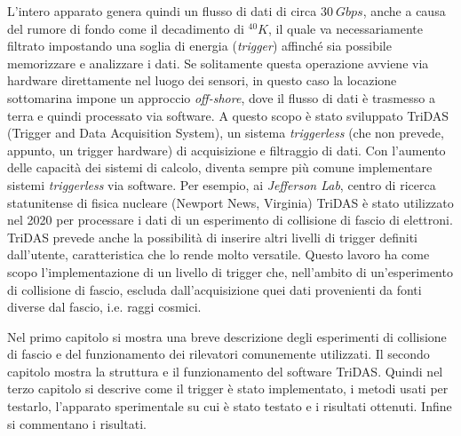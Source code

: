 \documentclass[../main.tex]{subfiles}
\begin{document}
L'intero apparato genera quindi un flusso di dati di circa $30\ Gbps$, anche a causa del rumore di fondo come il decadimento di ${}^{40}K$, il quale va necessariamente filtrato impostando una soglia di energia (\emph{trigger}) affinché sia possibile memorizzare e analizzare i dati. Se solitamente questa operazione avviene via hardware direttamente nel luogo dei sensori, in questo caso la locazione sottomarina impone un approccio \emph{off-shore}, dove il flusso di dati è trasmesso a terra e quindi processato via software. A questo scopo è stato sviluppato TriDAS (Trigger and Data Acquisition System), un sistema \emph{triggerless} (che non prevede, appunto, un trigger hardware) di acquisizione e filtraggio di dati. Con l'aumento delle capacità dei sistemi di calcolo, diventa sempre più comune implementare sistemi \emph{triggerless} via software. Per esempio, ai \emph{Jefferson Lab}, centro di ricerca statunitense di fisica nucleare (Newport News, Virginia) TriDAS è stato utilizzato nel 2020 per processare i dati di un esperimento di collisione di fascio di elettroni. TriDAS prevede anche la possibilità di inserire altri livelli di trigger definiti dall'utente, caratteristica che lo rende molto versatile. Questo lavoro ha come scopo l'implementazione di un livello di trigger che, nell'ambito di un'esperimento di collisione di fascio, escluda dall'acquisizione quei dati provenienti da fonti diverse dal fascio, i.e. raggi cosmici. 

Nel primo capitolo si mostra una breve descrizione degli esperimenti di collisione di fascio e del funzionamento dei rilevatori comunemente utilizzati.
Il secondo capitolo mostra la struttura e il funzionamento del software TriDAS.
Quindi nel terzo capitolo si descrive come il trigger è stato implementato, i metodi usati per testarlo, l'apparato sperimentale su cui è stato testato e i risultati ottenuti.
Infine si commentano i risultati.
\end{document}
